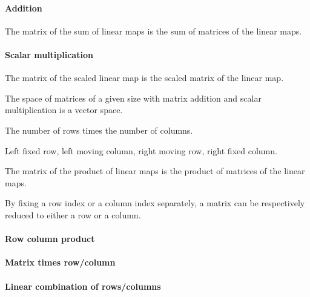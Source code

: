\begin{multicols}{3}
  \paragraph{\textbf{Addition}}
  The matrix of the sum of linear maps is the sum of matrices of the linear maps.
  \paragraph{\textbf{Scalar multiplication}}
  The matrix of the scaled linear map is the scaled matrix of the linear map.

  The space of matrices of a given size with matrix addition and scalar multiplication is a vector space.

  The number of rows times the number of columns.

  Left fixed row, left moving column, right moving row, right fixed column.

  The matrix of the product of linear maps is the product of matrices of the linear maps.

  By fixing a row index or a column index separately, a matrix can be respectively reduced to either a row or a column.

  \paragraph{\textbf{Row column product}}
  \paragraph{\textbf{Matrix times row/column}}
  \paragraph{\textbf{Linear combination of rows/columns}}




  


\end{multicols}
